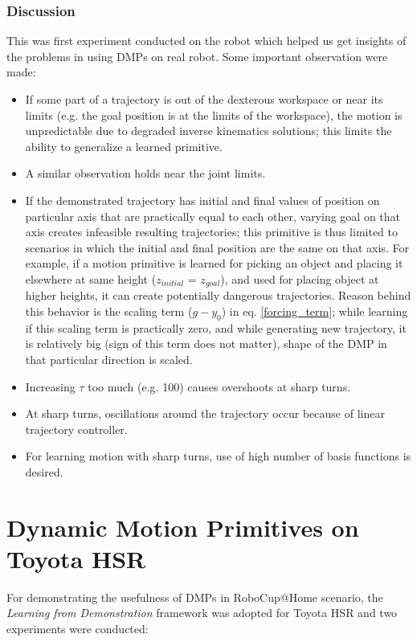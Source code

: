 \subsubsection{Discussion}

This was first experiment conducted on the robot which helped us get insights of the problems in using DMPs on real robot. Some important observation were made:
\begin{itemize}
	\item If some part of a trajectory is out of the dexterous workspace or near its limits (e.g. the goal position is at the limits of the workspace), the motion is unpredictable due to degraded inverse kinematics solutions; this limits the ability to generalize a learned primitive.
	\item A similar observation holds near the joint limits.
	\item If the demonstrated trajectory has initial and final values of position on particular axis that are practically equal to each other, varying goal on that axis creates infeasible resulting trajectories; this primitive is thus limited to scenarios in which the initial and final position are the same on that axis. For example, if a motion primitive is learned for picking an object and placing it elsewhere at same height ($z_{initial}$ = $z_{goal}$), and used for placing object at higher heights, it can create potentially dangerous trajectories. Reason behind this behavior is the scaling term ($g - y_0$) in eq. \ref{forcing_term}; while learning if this scaling term is practically zero, and while generating new trajectory, it is relatively big (sign of this term does not matter), shape of the DMP in that particular direction is scaled.    
	\item Increasing $\tau$ too much (e.g. 100) causes overshoots at sharp turns.
	\item At sharp turns, oscillations around the trajectory occur because of linear trajectory controller. 
	\item For learning motion with sharp turns, use of high number of basis functions is desired. 
	\end{itemize}

\section{Dynamic Motion Primitives on Toyota HSR}

For demonstrating the usefulness of DMPs in RoboCup@Home scenario, the \textit{Learning from Demonstration} framework was adopted for Toyota HSR and two experiments were conducted:

